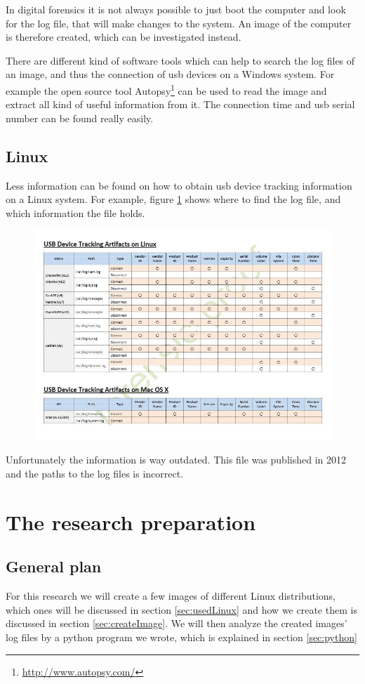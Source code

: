 \documentclass[a4paper]{article}
\begin{document}
In digital forensics it is not always possible to just boot the computer and look for the log file, that will make changes to the system. An image of the computer is therefore created, which can be investigated instead. 

There are different kind of software tools which can help to search the log files of an image, and thus the connection of usb devices on a Windows system. For example the open source tool Autopsy\footnote{\url{http://www.autopsy.com/}} can be used to read the image and extract all kind of useful information from it. The connection time and usb serial number can be found really easily. 

\subsection{Linux}
Less information can be found on how to obtain usb device tracking information on a Linux system. For example, figure \ref{fig:linuxlog} \cite{USBdeviceTracking} shows where to find the log file, and which information the file holds.
\begin{figure}[h]
\includegraphics[width=\linewidth]{linux.jpg}
\label{fig:linuxlog}
\end{figure}
Unfortunately the information is way outdated. This file was published in 2012 and the paths to the log files is incorrect.




\section{The research preparation}
\subsection{General plan}
For this research we will create a few images of different Linux distributions, which ones will be discussed in section \ref{sec:usedLinux} and how we create them is discussed in section \ref{sec:createImage}. We will then analyze the created images' log files by a python program we wrote, which is explained in section \ref{sec:python}
\end{document}
